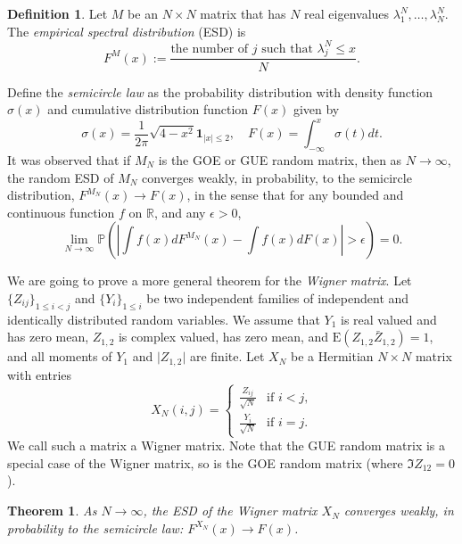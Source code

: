 \documentclass[11pt, a4paper]{article}
\numberwithin{equation}{section}
\newcommand{\E}{\mathrm{E}}
\newcommand{\id}{\mathbf{1}}
\newcommand{\realR}{\mathbb{R}}
\newcommand{\Prob}{\mathbb{P}}
\newtheorem{thm}{Theorem}
\theoremstyle{definition}
\newtheorem{defn}{Definition}
\theoremstyle{remark}
\begin{document}
\begin{defn}
  Let $M$ be an $N \times N$ matrix that has $N$ real eigenvalues $\lambda^N_1, \dotsc, \lambda^N_N$. The \emph{empirical spectral distribution} (ESD) is
  \begin{equation}
    F^M(x) := \frac{\text{the number of $j$ such that $\lambda^N_j \leq x$}}{N}.
  \end{equation}
\end{defn}

Define the \emph{semicircle law} as the probability distribution with density function $\sigma(x)$ and cumulative distribution function $F(x)$ given by
\begin{equation}
  \sigma(x) = \frac{1}{2\pi} \sqrt{4 - x^2} \id_{\lvert x \rvert \leq 2}, \quad F(x) = \int^x_{-\infty} \sigma(t) dt.
\end{equation}
It was observed that if $M_N$ is the GOE or GUE random matrix, then as $N \to \infty$, the random ESD of $M_N$ converges weakly, in probability, to the semicircle distribution, $F^{M_N}(x) \to F(x)$, in the sense that for any bounded and continuous function $f$ on $\realR$, and any $\epsilon > 0$,
\begin{equation}
  \lim_{N \to \infty} \Prob \left( \left\lvert \int f(x) dF^{M_N}(x) - \int f(x) dF(x) \right\rvert > \epsilon \right) = 0.
\end{equation}

We are going to prove a more general theorem for the \emph{Wigner matrix}. Let $\{ Z_{ij} \}_{1 \leq i < j}$ and $\{ Y_i \}_{1 \leq i}$ be two independent families of independent and identically distributed random variables. We assume that $Y_1$ is real valued and has zero mean, $Z_{1, 2}$ is complex valued, has zero mean, and $\E(Z_{1, 2} \bar{Z}_{1, 2}) = 1$, and all moments of $Y_1$ and $\lvert Z_{1, 2} \rvert$ are finite. Let $X_N$ be a Hermitian $N \times N$ matrix with entries
\begin{equation} \label{eq:entries_of_Wigner}
  X_N(i, j) =
  \begin{cases}
    \frac{Z_{ij}}{\sqrt{N}} & \text{if $i < j$,} \\
    \frac{Y_i}{\sqrt{N}} & \text{if $i = j$.}
  \end{cases}
\end{equation}
We call such a matrix a Wigner matrix. Note that the GUE random matrix is a special case of the Wigner matrix, so is the GOE random matrix (where $\Im Z_{12} = 0$).

\begin{thm} \label{thm:Wigner_ESD}
  As $N \to \infty$, the ESD of the Wigner matrix $X_N$ converges weakly, in probability to the semicircle law: $F^{X_N}(x) \to F(x)$.
\end{thm}
\end{document}
